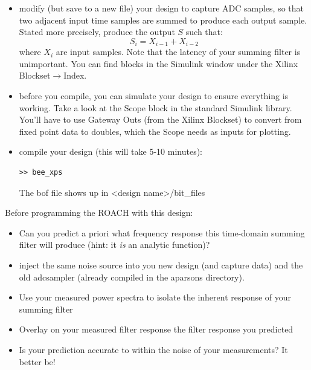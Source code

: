 \documentclass[11pt]{article}
\begin{document}
\begin{itemize}
\item modify (but save to a new file) your design to capture ADC samples, so that two adjacent input time samples are summed
to produce each output sample.  Stated more precisely, produce the output $S$ such that:
\begin{equation}
S_i = X_{i-1} + X_{i-2}
\end{equation}
where $X_i$ are input samples.  Note that the latency of your summing filter is unimportant.
You can find blocks in the Simulink window under the Xilinx Blockset$\to$Index.
\item before you compile, you can simulate your design to ensure everything is working.  Take a look at
the Scope block in the standard Simulink library. You'll have to use Gateway Outs (from the Xilinx Blockset)
to convert from fixed point data to doubles, which the Scope needs as inputs for plotting. 
\item compile your design (this will take 5-10 minutes):
\begin{verbatim}
>> bee_xps
\end{verbatim}
The bof file shows up in <design name>/bit\_files
\end{itemize}

Before programming the ROACH with this design:
\begin{itemize}
\item Can you predict a priori what frequency response this time-domain 
summing filter will produce (hint: it {\it is} an analytic function)?
\item inject the same noise source into you new design (and capture data) and the old adcsampler (already compiled in the aparsons directory).  
\item Use your measured power spectra to isolate the inherent response of your summing filter
\item Overlay on your measured filter response the filter response you predicted
\item Is your prediction accurate to within the noise of your measurements? It better be!
\end{itemize}


\end{document}
